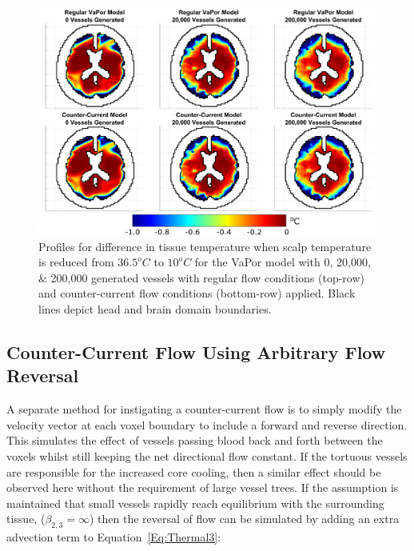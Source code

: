 \documentclass[11pt,english,a4paper,twoside,openright]{report}
\begin{document}
{{{{{{{\begin{figure}[h]
	\centering
	\includegraphics[width=\textwidth]{Chapter5/CounterCurrentDifferences}
	\caption[Comparison of profiles for difference in tissue temperature when scalp temperature is reduced from $36.5^{o}C$ to $10^{o}C$ when using the counter-current flow conditions in the VaPor model]{Profiles for difference in tissue temperature when scalp temperature is reduced from $36.5^{o}C$ to $10^{o}C$ for the VaPor model with 0, 20,000, \& 200,000 generated vessels with regular flow conditions (top-row) and counter-current flow conditions (bottom-row) applied. Black lines depict head and brain domain boundaries.}
	\label{fig:CounterCurrentResults1}
\end{figure}

\subsection{Counter-Current Flow Using Arbitrary Flow Reversal}
\label{Sec:5FlowReversal}

A separate method for instigating a counter-current flow is to simply modify the velocity vector at each voxel boundary to include a forward and reverse direction. This simulates the effect of vessels passing blood back and forth between the voxels whilst still keeping the net directional flow constant. If the tortuous vessels are responsible for the increased core cooling, then a similar effect should be observed here without the requirement of large vessel trees. If the assumption is maintained that small vessels rapidly reach equilibrium with the surrounding tissue, ($\beta_{2,3}=\infty$) then the reversal of flow can be simulated by adding an extra advection term to Equation~\ref{Eq:Thermal3}: 

}}}}}}}
\end{document}
